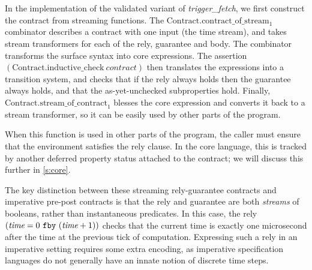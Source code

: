 In the implementation of the validated variant of \emph{trigger_fetch}, we first construct the contract from streaming functions.
The $\text{Contract.contract_of_stream}_1$ combinator describes a contract with one input (the time stream), and takes stream transformers for each of the rely, guarantee and body.
The combinator transforms the surface syntax into core expressions.
The assertion $(\text{Contract.inductive_check}~\textit{contract})$ then translates the expressions into a transition system, and checks that if the rely always holds then the guarantee always holds, and that the as-yet-unchecked subproperties hold.
Finally, $\text{Contract.stream_of_contract}_1$ blesses the core expression and converts it back to a stream transformer, so it can be easily used by other parts of the program.

When this function is used in other parts of the program, the caller must ensure that the environment satisfies the rely clause.
In the core language, this is tracked by another deferred property status attached to the contract; we will discuss this further in \autoref{s:core}.

The key distinction between these streaming rely-guarantee contracts and imperative pre-post contracts is that the rely and guarantee are both \emph{streams} of booleans, rather than instantaneous predicates.
In this case, the rely $(\textit{time} = 0~\texttt{fby}~(\textit{time} + 1))$ checks that the current time is exactly one microsecond after the time at the previous tick of computation.
Expressing such a rely in an imperative setting requires some extra encoding, as imperative specification languages do not generally have an innate notion of discrete time steps.
